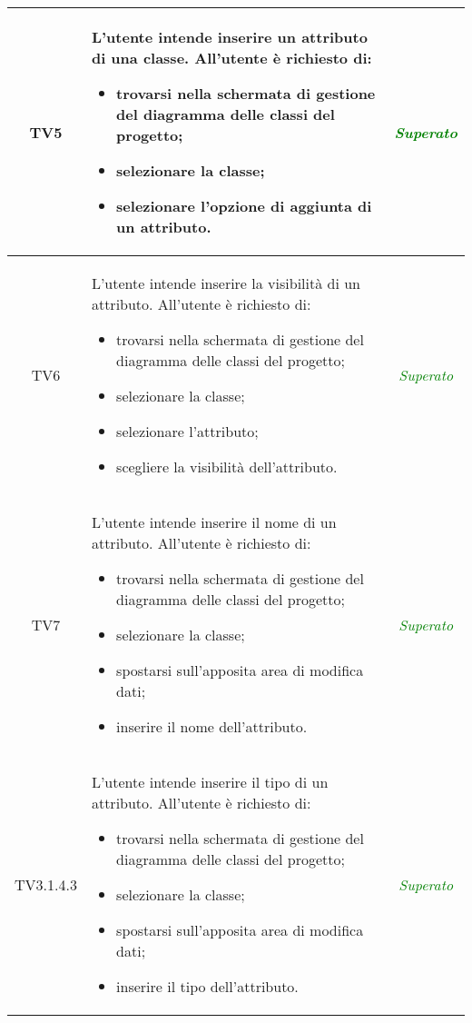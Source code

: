 \begin{longtable}{|c|>{}m{8cm}|c|}
\hypertarget{TV5}{TV5} & L'utente intende inserire un attributo di una classe.
All'utente è richiesto di:
\begin{itemize}
	\item trovarsi nella schermata di gestione del diagramma delle classi del progetto;
	\item selezionare la classe;
	\item selezionare l'opzione di aggiunta di un attributo.
\end{itemize} & \textcolor{Green}{\textit{Superato}}\\ \hline

\hypertarget{TV6}{TV6} & L'utente intende inserire la visibilità di un attributo.
All'utente è richiesto di:
\begin{itemize}
	\item trovarsi nella schermata di gestione del diagramma delle classi del progetto;
	\item selezionare la classe;
	\item selezionare l'attributo;
	\item scegliere la visibilità dell'attributo.
\end{itemize} & \textcolor{Green}{\textit{Superato}}\\ \hline

\hypertarget{TV7}{TV7} & L'utente intende inserire il nome di un attributo.
All'utente è richiesto di:
\begin{itemize}
	\item trovarsi nella schermata di gestione del diagramma delle classi del progetto;
	\item selezionare la classe;
	\item spostarsi sull'apposita area di modifica dati; 
	\item inserire il nome dell'attributo.
\end{itemize} & \textcolor{Green}{\textit{Superato}}\\ \hline

\hypertarget{TV3.1.4.3}{TV3.1.4.3} & L'utente intende inserire il tipo di un attributo.
All'utente è richiesto di:
\begin{itemize}
	\item trovarsi nella schermata di gestione del diagramma delle classi del progetto;
	\item selezionare la classe;
	\item spostarsi sull'apposita area di modifica dati;
	\item inserire il tipo dell'attributo.
\end{itemize} & \textcolor{Green}{\textit{Superato}}\\ \hline


\end{longtable}
